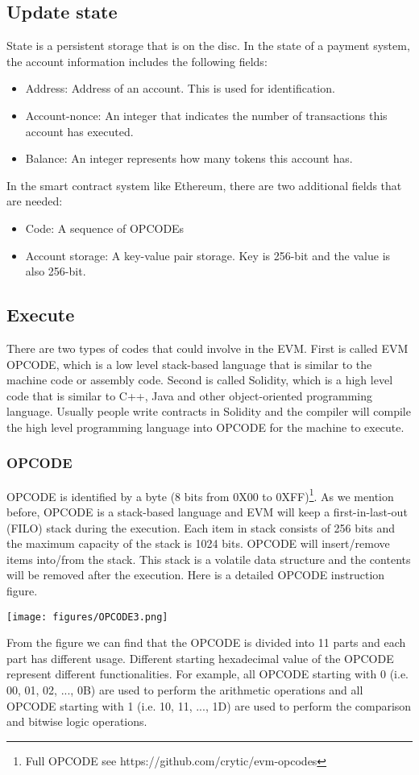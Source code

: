\documentclass{article}
\begin{document}
\subsection*{Update state}
State is a persistent storage that is on the disc. In the state of a payment system, the account information includes the following fields:
\begin{itemize}
  \item Address: Address of an account. This is used for identification.
  \item Account-nonce: An integer that indicates the number of transactions this account has executed.
  \item Balance: An integer represents how many tokens this account has.
\end{itemize}
In the smart contract system like Ethereum, there are two additional fields that are needed:
\begin{itemize}
  \item Code: A sequence of OPCODEs
  \item Account storage: A key-value pair storage. Key is 256-bit and the value is also 256-bit. 
\end{itemize}


\subsection*{Execute}
There are two types of codes that could involve in the EVM. First is called EVM OPCODE, which is a low level stack-based language that is similar to the machine code or assembly code. Second is called Solidity, which is a high level code that is similar to C++, Java and other object-oriented programming language. Usually people write contracts in Solidity and the compiler will compile the high level programming language into OPCODE for the machine to execute.

\subsubsection*{OPCODE}
OPCODE is identified by a byte (8 bits from 0X00 to 0XFF)\footnote{Full OPCODE see https://github.com/crytic/evm-opcodes}. As we mention before, OPCODE is a stack-based language and EVM will keep a first-in-last-out (FILO) stack during the execution. Each item in stack consists of 256 bits and the maximum capacity of the stack is 1024 bits. OPCODE will insert/remove items into/from the stack. This stack is a volatile data structure and the contents will be removed after the execution. Here is a detailed OPCODE instruction figure.
\begin{center}
    \texttt{[image: figures/OPCODE3.png]}
\end{center}
From the figure we can find that the OPCODE is divided into 11 parts and each part has different usage. Different starting hexadecimal value of the OPCODE represent different functionalities. For example, all OPCODE starting with 0 (i.e. 00, 01, 02, ..., 0B) are used to perform the arithmetic operations and all OPCODE starting with 1 (i.e. 10, 11, ..., 1D) are used to perform the comparison and bitwise logic operations.
\end{document}
